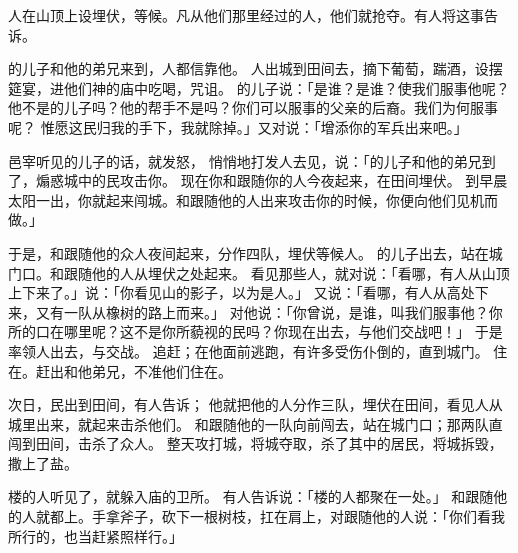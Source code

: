{人在山顶上设埋伏，等候{}。凡从他们那里经过的人，他们就抢夺。有人将这事告诉{}。
\par }{\PP {}的儿子{}和他的弟兄来到{}，{}人都信靠他。
人出城到田间去，摘下葡萄，踹酒，设摆筵宴，进他们神的庙中吃喝，咒诅{}。
的儿子{}说：「{}是谁？{}是谁？使我们服事他呢？他不是{}的儿子吗？他的帮手不是{}吗？你们可以服事{}的父亲{}的后裔。我们为何服事{}呢？
惟愿这民归我的手下，我就除掉{}。」{}又对{}说：「增添你的军兵出来吧。」
\par }{\PP {}邑宰{}听见{}的儿子{}的话，就发怒，
悄悄地打发人去见{}，说：「{}的儿子{}和他的弟兄到了{}，煽惑城中的民攻击你。
现在你和跟随你的人今夜起来，在田间埋伏。
到早晨太阳一出，你就起来闯城。{}和跟随他的人出来攻击你的时候，你便向他们见机而做。」
\par }{\PP {}于是，{}和跟随他的众人夜间起来，分作四队，埋伏等候{}人。
的儿子{}出去，站在城门口。{}和跟随他的人从埋伏之处起来。
看见那些人，就对{}说：「看哪，有人从山顶上下来了。」{}说：「你看见山的影子，以为是人。」
又说：「看哪，有人从高处下来，又有一队从{}橡树的路上而来。」
对他说：「你曾说，{}是谁，叫我们服事他？你所{}的口在哪里呢？这不是你所藐视的民吗？你现在出去，与他们交战吧！」
于是{}率领{}人出去，与{}交战。
追赶{}；{}在他面前逃跑，有许多受伤仆倒的，直到城门。
住在{}。{}赶出{}和他弟兄，不准他们住在{}。
\par }{\PP {}次日，民出到田间，有人告诉{}；
他就把他的人分作三队，埋伏在田间，看见{}人从城里出来，就起来击杀他们。
和跟随他的一队向前闯去，站在城门口；那两队直闯到田间，击杀了众人。
整天攻打城，将城夺取，杀了其中的居民，将城拆毁，撒上了盐。
\par }{\PP {}楼的人听见了，就躲入{}庙的卫所。
有人告诉{}说：「{}楼的人都聚在一处。」
和跟随他的人就都上{}。{}手拿斧子，砍下一根树枝，扛在肩上，对跟随他的人说：「你们看我所行的，也当赶紧照样行。」
}
